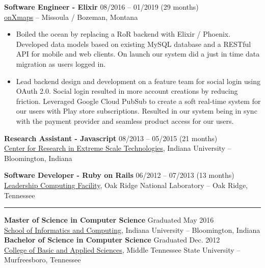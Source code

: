 \documentclass[12pt,letterpaper]{article}
\begin{document}
\noindent\textbf{Software Engineer - Elixir}
\hfill{08/2016 -- 01/2019 (29 months)} \\
\href{https://www.onxmaps.com/}{onXmaps} -- Missoula / Bozeman, Montana

\begin{itemize}

  \item Boiled the ocean by replacing a RoR backend with Elixir / Phoenix. Developed data models based on existing MySQL database and a RESTful API for mobile and web clients. On launch our system did a just in time data migration as users logged in.

  \item Lead backend design and development on a feature team for social login using OAuth 2.0. Social login resulted in more account creations by reducing friction. Leveraged Google Cloud PubSub to create a soft real-time system for our users with Play store subscriptions. Resulted in our system being in sync with the payment provider and seamless product access for our users.

\end{itemize}

\noindent\textbf{Research Assistant - Javascript}
\hfill{08/2013 -- 05/2015 (21 months)} \\
\href{https://pti.iu.edu/centers/crest.html}{Center for Research in Extreme Scale Technologies}, Indiana University -- Bloomington, Indiana

\noindent\textbf{Software Developer - Ruby on Rails}
\hfill{06/2012 -- 07/2013 (13 months)} \\
\href{https://www.olcf.ornl.gov/}{Leadership Computing Facility}, Oak Ridge National Laboratory -- Oak Ridge, Tennessee

\noindent\rule{7.5in}{0.4pt}

\noindent\textbf{Master of Science in Computer Science}
\hfill{Graduated May 2016} \\
\href{https://luddy.indiana.edu/}{School of Informatics and Computing}, Indiana University -- Bloomington, Indiana \\

\noindent\textbf{Bachelor of Science in Computer Science}
\hfill{Graduated Dec. 2012} \\
\href{https://www.mtsu.edu/cbas/}{College of Basic and Applied Sciences}, Middle Tennessee State University -- Murfreesboro, Tennessee
\end{document}
